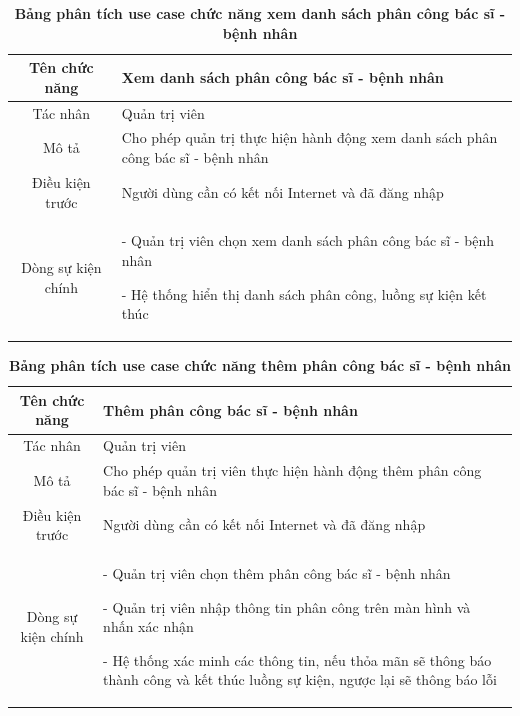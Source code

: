   \begin{table}[H]
    \caption{\bfseries \fontsize{12pt}{0pt}\selectfont Bảng phân tích use case chức năng xem danh sách phân công bác sĩ - bệnh nhân}
    \centering
    \begin{tabularx}{0.9\textwidth}{|c|X|}
      \hline
      \textbf{Tên chức năng} & \textbf{Xem danh sách phân công bác sĩ - bệnh nhân} \\
      \hline
      Tác nhân & Quản trị viên \\
      \hline
      Mô tả & Cho phép quản trị thực hiện hành động xem danh sách phân công bác sĩ - bệnh nhân \\
      \hline
      Điều kiện trước & Người dùng cần có kết nối Internet và đã đăng nhập \\
      \hline
      Dòng sự kiện chính & 
        - Quản trị viên chọn xem danh sách phân công bác sĩ - bệnh nhân
        
        - Hệ thống hiển thị danh sách phân công, luồng sự kiện kết thúc         
        \\
      \hline
    \end{tabularx}
  \end{table}

  \begin{table}[H]
    \caption{\bfseries \fontsize{12pt}{0pt}\selectfont Bảng phân tích use case chức năng thêm phân công bác sĩ - bệnh nhân}
    \centering
    \begin{tabularx}{0.9\textwidth}{|c|X|}
      \hline
      \textbf{Tên chức năng} & \textbf{Thêm phân công bác sĩ - bệnh nhân} \\
      \hline
      Tác nhân & Quản trị viên \\
      \hline
      Mô tả & Cho phép quản trị viên thực hiện hành động thêm phân công bác sĩ - bệnh nhân \\
      \hline
      Điều kiện trước & Người dùng cần có kết nối Internet và đã đăng nhập \\
      \hline
      Dòng sự kiện chính & 
        - Quản trị viên chọn thêm phân công bác sĩ - bệnh nhân

        - Quản trị viên nhập thông tin phân công trên màn hình và nhấn xác nhận

        - Hệ thống xác minh các thông tin, nếu thỏa mãn sẽ thông báo thành công và kết thúc luồng sự kiện, ngược lại 
        sẽ thông báo lỗi         
        \\
      \hline
    \end{tabularx}
  \end{table}

